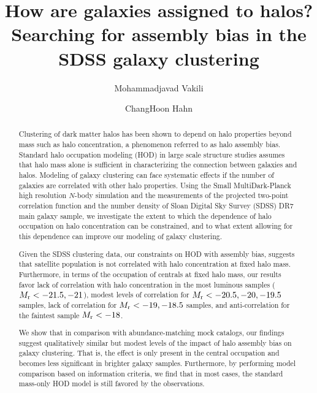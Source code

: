 \documentclass[twocolumn]{aastex61}
\begin{document}
\title{How are galaxies assigned to halos? \\ Searching for assembly bias in the SDSS galaxy clustering}

\author{Mohammadjavad Vakili}

\author{ChangHoon Hahn}


\begin{abstract}
Clustering of dark matter halos has been shown to depend on halo properties beyond mass such as halo concentration, a phenomenon referred to as halo assembly bias. Standard halo occupation modeling (HOD) in large scale structure studies assumes that halo mass alone is sufficient in characterizing the connection between galaxies and halos. Modeling of galaxy clustering can face systematic effects if the number of galaxies are correlated with other halo properties. Using the Small MultiDark-Planck high resolution $N$-body simulation and the measurements of the projected two-point correlation function and the number density of Sloan Digital Sky Survey (SDSS) DR7 main galaxy sample, we investigate the extent to which the dependence of halo occupation on halo concentration can be constrained, and to what extent allowing for this dependence can improve our modeling of galaxy clustering.  

Given the SDSS clustering data, our constraints on HOD with assembly bias, suggests that satellite population is not correlated with halo concentration at fixed halo mass. Furthermore, in terms of the occupation of centrals at fixed halo mass, our results favor lack of correlation with halo concentration in the most luminous samples ($M_{\rm r}<-21.5,-21$), modest levels of correlation for $M_{\rm r}<-20.5,-20, -19.5$ samples, lack of correlation for $M_{\rm r}<-19,-18.5$ samples, and anti-correlation for the faintest sample $M_{\rm r}<-18$.

We show that in comparison with abundance-matching mock catalogs, our findings suggest qualitatively similar but modest levels of the impact of halo assembly bias on galaxy clustering. That is, the effect is only present in the central occupation and becomes less significant in brighter galaxy samples.
Furthermore, by performing model comparison based on information criteria, we find that in most cases, the standard mass-only HOD model is still favored by the observations.

\end{abstract}
\end{document}
